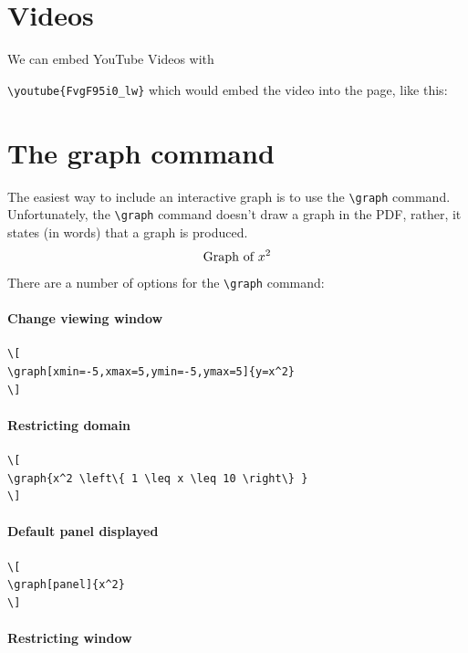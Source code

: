 \documentclass{ximera}
\begin{document}
\section{Videos}

We can embed YouTube Videos with 




\verb|\youtube{FvgF95i0_lw}| which would embed the video into the page, like this:
\begin{center}
\end{center}



\section{The graph command}

The easiest way to include an interactive graph is to use the
\verb|\graph| command. Unfortunately, the \verb|\graph| command
doesn't draw a graph in the PDF, rather, it states (in words) that a
graph is produced.
\[
\text{Graph of $x^2$}
\]
There are a number of options for the \verb|\graph| command:


\paragraph{Change viewing window}
\begin{verbatim}
\[
\graph[xmin=-5,xmax=5,ymin=-5,ymax=5]{y=x^2}
\]
\end{verbatim}



\paragraph{Restricting domain}


\begin{verbatim}
\[
\graph{x^2 \left\{ 1 \leq x \leq 10 \right\} }
\]
\end{verbatim}
\paragraph{Default panel displayed}

  
\begin{verbatim}
\[
\graph[panel]{x^2}
\]
\end{verbatim}
\paragraph{Restricting window}
\end{document}
